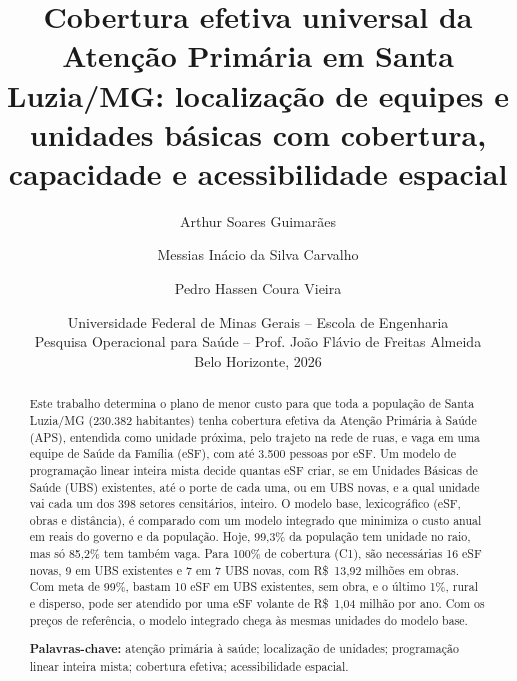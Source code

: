 \documentclass[11pt,a4paper]{article}
\title{\textbf{Cobertura efetiva universal da Atenção Primária em Santa Luzia/MG:} localização de equipes e unidades básicas com cobertura, capacidade e acessibilidade espacial}
\author{Arthur Soares Guimarães \and Messias Inácio da Silva Carvalho \and Pedro Hassen Coura Vieira}
\date{Universidade Federal de Minas Gerais -- Escola de Engenharia\\ Pesquisa Operacional para Saúde -- Prof. João Flávio de Freitas Almeida\\ Belo Horizonte, 2026}
\begin{document}
\maketitle

\begin{abstract}
\noindent Este trabalho determina o plano de menor custo para que toda a população de Santa Luzia/MG (230.382 habitantes) tenha cobertura efetiva da Atenção Primária à Saúde (APS), entendida como unidade próxima, pelo trajeto na rede de ruas, e vaga em uma equipe de Saúde da Família (eSF), com até 3.500 pessoas por eSF. Um modelo de programação linear inteira mista decide quantas eSF criar, se em Unidades Básicas de Saúde (UBS) existentes, até o porte de cada uma, ou em UBS novas, e a qual unidade vai cada um dos 398 setores censitários, inteiro. O modelo base, lexicográfico (eSF, obras e distância), é comparado com um modelo integrado que minimiza o custo anual em reais do governo e da população. Hoje, 99,3\% da população tem unidade no raio, mas só 85,2\% tem também vaga. Para 100\% de cobertura (C1), são necessárias 16 eSF novas, 9 em UBS existentes e 7 em 7 UBS novas, com R\$~13,92 milhões em obras. Com meta de 99\%, bastam 10 eSF em UBS existentes, sem obra, e o último 1\%, rural e disperso, pode ser atendido por uma eSF volante de R\$~1,04 milhão por ano. Com os preços de referência, o modelo integrado chega às mesmas unidades do modelo base.

\medskip\noindent\textbf{Palavras-chave:} atenção primária à saúde; localização de unidades; programação linear inteira mista; cobertura efetiva; acessibilidade espacial.
\end{abstract}
\end{document}
